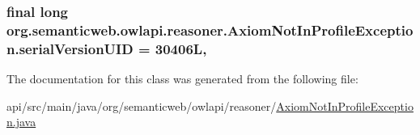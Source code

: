\hypertarget{classorg_1_1semanticweb_1_1owlapi_1_1reasoner_1_1_axiom_not_in_profile_exception_ab8729844dcaa209745be54e1b98b716b}{
\subsubsection[{serial\-Version\-U\-I\-D}]{\setlength{\rightskip}{0pt plus 5cm}final long org.\-semanticweb.\-owlapi.\-reasoner.\-Axiom\-Not\-In\-Profile\-Exception.\-serial\-Version\-U\-I\-D = 30406\-L\hspace{0.3cm}{\ttfamily [static]}, {\ttfamily [private]}}}\label{classorg_1_1semanticweb_1_1owlapi_1_1reasoner_1_1_axiom_not_in_profile_exception_ab8729844dcaa209745be54e1b98b716b}


The documentation for this class was generated from the following file\-:\begin{DoxyCompactItemize}
\item 
api/src/main/java/org/semanticweb/owlapi/reasoner/\hyperlink{_axiom_not_in_profile_exception_8java}{Axiom\-Not\-In\-Profile\-Exception.\-java}\end{DoxyCompactItemize}
